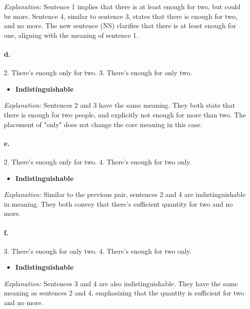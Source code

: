 \documentclass{article}
\begin{document}
\textit{Explanation:} Sentence 1 implies that there is at least enough for two, but could be more. Sentence 4, similar to sentence 3, states that there is enough for two, and no more. The new sentence (NS) clarifies that there is at least enough for one, aligning with the meaning of sentence 1.

\paragraph{d.}
2. There's enough only for two.
3. There's enough for only two.

\begin{itemize}
    \item \textbf{Indistinguishable}
\end{itemize}

\textit{Explanation:} Sentences 2 and 3 have the same meaning. They both state that there is enough for two people, and explicitly not enough for more than two. The placement of "only" does not change the core meaning in this case.

\paragraph{e.}
2. There's enough only for two.
4. There's enough for two only.

\begin{itemize}
    \item \textbf{Indistinguishable}
\end{itemize}

\textit{Explanation:} Similar to the previous pair, sentences 2 and 4 are indistinguishable in meaning. They both convey that there's sufficient quantity for two and no more.

\paragraph{f.}
3. There's enough for only two.
4. There's enough for two only.

\begin{itemize}
    \item \textbf{Indistinguishable}
\end{itemize}

\textit{Explanation:} Sentences 3 and 4 are also indistinguishable. They have the same meaning as sentences 2 and 4, emphasizing that the quantity is sufficient for two and no more.
\end{document}

